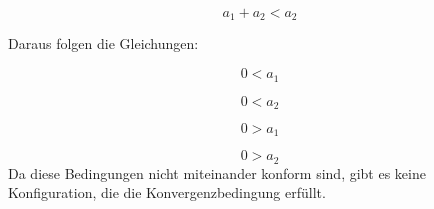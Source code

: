 \documentclass[11pt]{article} %
\begin{document}
\begin{equation}
a_{1} + a_{2} < a_{2} 
\end{equation}

Daraus folgen die Gleichungen:

\begin{equation}
0 < a_{1}
\end{equation}

\begin{equation}
0 < a_{2}
\end{equation}

\begin{equation}
0 > a_{1} 
\end{equation}

\begin{equation}
0 > a_{2} 
\end{equation}
Da diese Bedingungen nicht miteinander konform sind, gibt es keine Konfiguration, die die Konvergenzbedingung erfüllt.
\end{document}
